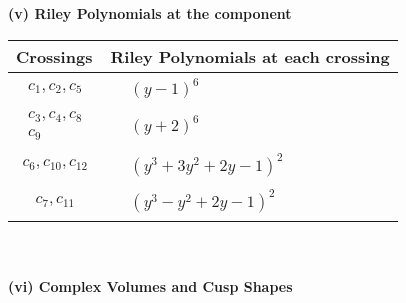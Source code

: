 \documentclass[1p]{elsarticle_modified}
\theoremstyle{definition}
\begin{document}
\newpage\renewcommand{\arraystretch}{1}
\flushleft \textbf{(v) Riley Polynomials at the component}\newline \\
\begin{tabular}{m{50pt}|m{274pt}}
Crossings & \hspace{64pt}Riley Polynomials at each crossing \\
\hline $$\begin{aligned}c_{1},c_{2},c_{5}\end{aligned}$$&$\begin{aligned}
&(y-1)^6
\end{aligned}$\\
\hline $$\begin{aligned}c_{3},c_{4},c_{8}\\c_{9}\end{aligned}$$&$\begin{aligned}
&(y+2)^6
\end{aligned}$\\
\hline $$\begin{aligned}c_{6},c_{10},c_{12}\end{aligned}$$&$\begin{aligned}
&(y^3+3 y^2+2 y-1)^2
\end{aligned}$\\
\hline $$\begin{aligned}c_{7},c_{11}\end{aligned}$$&$\begin{aligned}
&(y^3- y^2+2 y-1)^2
\end{aligned}$\\
\hline
\end{tabular}\\~\\
\newpage\flushleft \textbf{(vi) Complex Volumes and Cusp Shapes}
\end{document}
